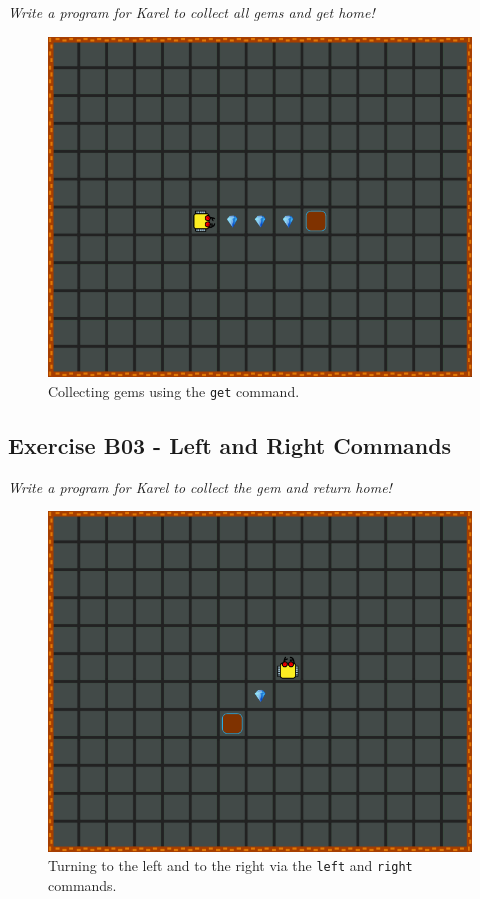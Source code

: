 {\em Write a program for Karel to collect all gems and get home! 

\begin{figure}[!ht]
\begin{center}
\includegraphics[height=0.4\textwidth]{imgk/b02.png}
\end{center}
\vspace{-4mm}
\caption{Collecting gems using the {\tt get} command.}
\label{fig:b02}
\vspace{-4mm}
\end{figure}
\noindent

\newpage

\subsection{Exercise B03 - Left and Right Commands}

{\em Write a program for Karel to collect the gem and return home! 

\begin{figure}[!ht]
\begin{center}
\includegraphics[height=0.4\textwidth]{imgk/b03.png}
\end{center}
\vspace{-4mm}
\caption{Turning to the left and to the right via the {\tt left} and {\tt right} commands.}
\label{fig:b03}
\vspace{-4mm}
\end{figure}
\noindent

}}
